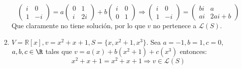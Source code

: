 \begin{ejercicio}
\begin{enumerate}
\begin{equation*}
\begin{pmatrix}
				      i & 0  \\
				      1 & -i
			      \end{pmatrix} = a\begin{pmatrix}
				      0 & 1  \\
				      i & 2i
			      \end{pmatrix} + b\begin{pmatrix}
				      i & 0 \\
				      0 & 1
			      \end{pmatrix}
			      \Rightarrow
			      \begin{pmatrix}
				      i & 0  \\
				      1 & -i
			      \end{pmatrix} = \begin{pmatrix}
				      bi & a       \\
				      ai & 2ai + b
			      \end{pmatrix}
		      \end{equation*}
		      Que claramente no tiene solución, por lo que \( v \) no pertenece a \( \mathcal{L}(S) \).
		\item \( V = \mathbb{R}[x], v = x^2 + x + 1, S = \{x, x^2 + 1, x^3\} \).
		      Sea $a = -1, b = 1, c = 0$, $a,b,c \in \R$ tales que $v = a(x) + b(x^2 + 1) + c(x^3)$ entonces:
		      \begin{equation*}
			      x^2 + x + 1 = x^2 + x + 1 \Rightarrow v \in \mathcal{L}(S)
		      \end{equation*}
	\end{enumerate}
\end{ejercicio}



